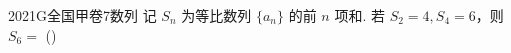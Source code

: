 
\begin{problem}{2021}{G}{全国甲卷}{7}{数列}
记 $S_n$ 为等比数列 $\{a_n\}$ 的前 $n$ 项和. 若 $S_2=4, S_4=6$，则 $S_6=$
(\hspace{1cm})
\begin{choices}
\end{choices}
\end{problem}